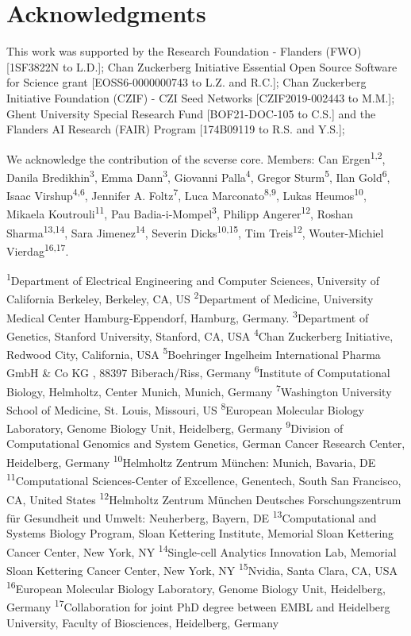 \documentclass[unnumsec,webpdf,modern,large,namedate]{oup-authoring-template}%
\begin{document}
\section{Acknowledgments}

This work was supported by the Research Foundation - Flanders (FWO) [1SF3822N to L.D.]; 
Chan Zuckerberg Initiative Essential Open Source Software for Science grant [EOSS6-0000000743 to L.Z. and R.C.];
Chan Zuckerberg Initiative Foundation (CZIF) - CZI Seed Networks [CZIF2019-002443 to M.M.];
Ghent University Special Research Fund [BOF21-DOC-105 to C.S.]
and the Flanders AI Research (FAIR) Program [174B09119 to R.S. and Y.S.]; 

We acknowledge the contribution of the scverse core. Members: Can Ergen\textsuperscript{1,2}, Danila Bredikhin\textsuperscript{3}, Emma Dann\textsuperscript{3}, Giovanni Palla\textsuperscript{4}, Gregor Sturm\textsuperscript{5}, Ilan Gold\textsuperscript{6}, Isaac Virshup\textsuperscript{4,6}, Jennifer A. Foltz\textsuperscript{7}, Luca Marconato\textsuperscript{8,9}, Lukas Heumos\textsuperscript{10}, Mikaela Koutrouli\textsuperscript{11}, Pau Badia-i-Mompel\textsuperscript{3}, Philipp Angerer\textsuperscript{12}, Roshan Sharma\textsuperscript{13,14}, Sara Jimenez\textsuperscript{14}, Severin Dicks\textsuperscript{10,15}, Tim Treis\textsuperscript{12}, Wouter-Michiel Vierdag\textsuperscript{16,17}.

\textsuperscript{1}Department of Electrical Engineering and Computer Sciences, University of California Berkeley, Berkeley, CA, US
\textsuperscript{2}Department of Medicine, University Medical Center Hamburg‐Eppendorf, Hamburg, Germany.
\textsuperscript{3}Department of Genetics, Stanford University, Stanford, CA, USA
\textsuperscript{4}Chan Zuckerberg Initiative, Redwood City, California, USA
\textsuperscript{5}Boehringer Ingelheim International Pharma GmbH \& Co KG , 88397 Biberach/Riss, Germany
\textsuperscript{6}Institute of Computational Biology, Helmholtz, Center Munich, Munich, Germany
\textsuperscript{7}Washington University School of Medicine, St. Louis, Missouri, US
\textsuperscript{8}European Molecular Biology Laboratory, Genome Biology Unit, Heidelberg, Germany
\textsuperscript{9}Division of Computational Genomics and System Genetics, German Cancer Research Center, Heidelberg, Germany
\textsuperscript{10}Helmholtz Zentrum München: Munich, Bavaria, DE
\textsuperscript{11}Computational Sciences-Center of Excellence, Genentech, South San Francisco, CA, United States
\textsuperscript{12}Helmholtz Zentrum München Deutsches Forschungszentrum für Gesundheit und Umwelt: Neuherberg, Bayern, DE
\textsuperscript{13}Computational and Systems Biology Program, Sloan Kettering Institute, Memorial Sloan Kettering Cancer Center, New York, NY
\textsuperscript{14}Single-cell Analytics Innovation Lab, Memorial Sloan Kettering Cancer Center, New York, NY
\textsuperscript{15}Nvidia, Santa Clara, CA, USA
\textsuperscript{16}European Molecular Biology Laboratory, Genome Biology Unit, Heidelberg, Germany
\textsuperscript{17}Collaboration for joint PhD degree between EMBL and Heidelberg University, Faculty of Biosciences, Heidelberg, Germany



\end{document}
